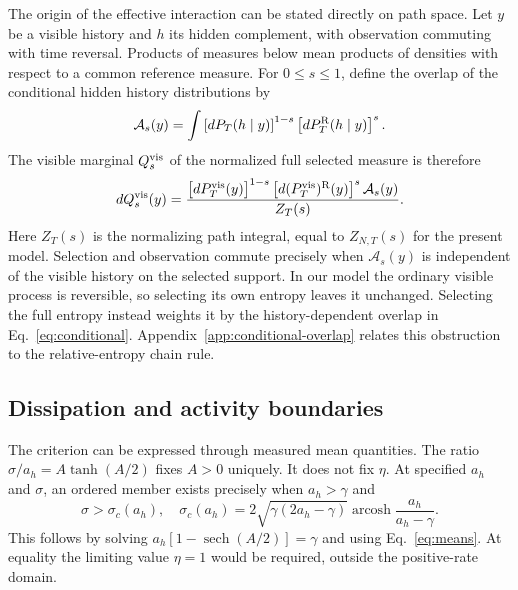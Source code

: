 \documentclass[aps,pre,reprint,amsmath,amssymb,longbibliography,floatfix]{revtex4-2}
\begin{document}
The origin of the effective interaction can be stated directly on path
space. Let $y$ be a visible history and $h$ its hidden complement, with
observation commuting with time reversal. Products of measures below
mean products of densities with respect to a common reference measure.
For $0\leq s\leq1$, define
the overlap of the conditional hidden history distributions by
\begin{equation}
 \mathcal A_s(y)=\int
 \left[dP_T(h\mid y)\right]^{1-s}
 \left[dP_T^{\rm R}(h\mid y)\right]^s.
 \label{eq:app-conditional-affinity}
\end{equation}
The visible marginal $Q_s^{\rm vis}$ of the normalized full selected
measure is therefore
\begin{equation}
 dQ_s^{\rm vis}(y)
 =\frac{
 \left[dP_T^{\rm vis}(y)\right]^{1-s}
 \left[d(P_T^{\rm vis})^{\rm R}(y)\right]^s
 \mathcal A_s(y)}{Z_T(s)}.
 \label{eq:app-visible-conditional-tilt}
\end{equation}
Here $Z_T(s)$ is the normalizing path integral, equal to $Z_{N,T}(s)$
for the present model. Selection and observation commute precisely when $\mathcal A_s(y)$
is independent of the visible history on the selected support.
In our model the ordinary visible process is reversible, so selecting
its own entropy leaves it unchanged. Selecting the full entropy instead
weights it by the history-dependent overlap in Eq.~\eqref{eq:conditional}.
Appendix~\ref{app:conditional-overlap} relates this obstruction to the
relative-entropy chain rule.

\subsection{Dissipation and activity boundaries}
The criterion can be expressed through measured mean quantities.
The ratio $\sigma/a_h=A\tanh(A/2)$ fixes $A>0$ uniquely. It does not
fix $\eta$. At specified $a_h$ and $\sigma$, an ordered member exists
precisely when $a_h>\gamma$ and
\begin{equation}
 \sigma>\sigma_c(a_h),\quad
 \sigma_c(a_h)=2\sqrt{\gamma(2a_h-\gamma)}
 \operatorname{arcosh}\frac{a_h}{a_h-\gamma}.
 \label{eq:activityfrontier}
\end{equation}
This follows by solving $a_h\left[1-\operatorname{sech}(A/2)\right]=\gamma$
and using Eq.~\eqref{eq:means}. At equality the limiting value
$\eta=1$ would be required, outside the positive-rate domain.
\end{document}
